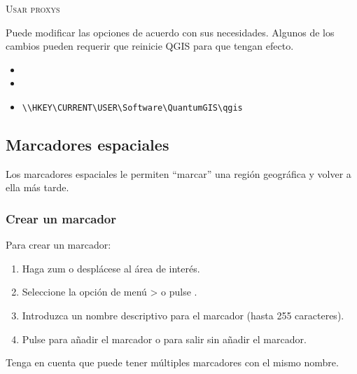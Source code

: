 \begin{Tip} \caption{\textsc{Usar proxys}}
\end{Tip}

Puede modificar las opciones de acuerdo con sus necesidades. Algunos 
de los cambios pueden requerir que reinicie QGIS para que tengan efecto.

\begin{itemize}
\item {}
\item {}
\item {}
\begin{verbatim}
\\HKEY\CURRENT\USER\Software\QuantumGIS\qgis
\end{verbatim}
\end{itemize}


\subsection{Marcadores espaciales}\label{sec:bookmarks}

Los marcadores espaciales le permiten ``marcar'' una región geográfica y volver a ella
más tarde.

\subsubsection{Crear un marcador}
Para crear un marcador:
\begin{enumerate}
\item Haga zum o desplácese al área de interés.
\item Seleccione la opción de menú  >  o pulse .
\item Introduzca un nombre descriptivo para el marcador (hasta 255 caracteres).
\item Pulse  para añadir el marcador o  para salir sin añadir el marcador.
\end{enumerate}

Tenga en cuenta que puede tener múltiples marcadores con el mismo nombre.

